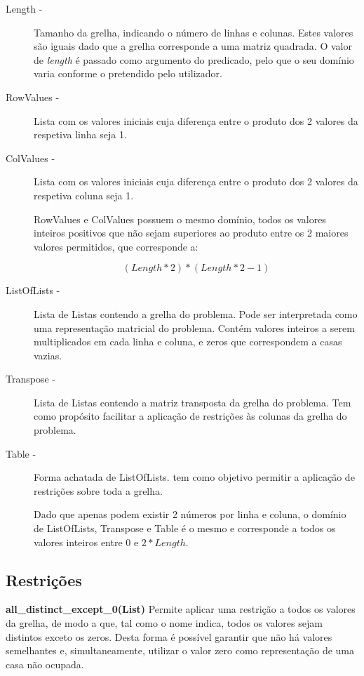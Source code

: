 \documentclass[11pt]{article}
\begin{document}
\begin{description}

\item[Length - ] Tamanho da grelha, indicando o número de linhas e colunas. Estes valores são 
iguais dado que a grelha corresponde a uma matriz quadrada. O valor de \emph{length} é passado 
como argumento do predicado, pelo que o seu domínio varia conforme o pretendido pelo utilizador.

\item[RowValues - ] Lista com os valores iniciais cuja diferença entre o produto dos 2 valores 
da respetiva linha seja 1.

\item[ColValues - ] Lista com os valores iniciais cuja diferença entre o produto dos 2 valores 
da respetiva coluna seja 1.

RowValues e ColValues possuem o mesmo domínio, todos os valores inteiros positivos que não 
sejam superiores ao produto entre os 2 maiores valores permitidos, que corresponde a:

\[(Length *2)*(Length * 2 - 1)\]

\item[ListOfLists - ] Lista de Listas contendo a grelha do problema. Pode ser interpretada 
como uma representação matricial do problema. Contém valores inteiros a serem multiplicados 
em cada linha e coluna, e zeros que correspondem a casas vazias.

\item[Transpose - ] Lista de Listas contendo a matriz transposta da grelha do problema. Tem 
como propósito facilitar a aplicação de restrições às colunas da grelha do problema.

\item[Table - ] Forma achatada de ListOfLists. tem como objetivo permitir a aplicação de 
restrições sobre toda a grelha. 

Dado que apenas podem existir 2 números por linha e coluna, o domínio de ListOfLists, 
Transpose e Table é o mesmo e corresponde a todos os valores inteiros entre 0 e \(2*Length\).



\end{description}

\subsection{Restrições}

\textbf{ all\_distinct\_except\_0(List)} Permite aplicar uma restrição a todos os valores da 
grelha, de modo a que, tal como o nome indica, todos os valores sejam distintos exceto os zeros. 
Desta forma é possível garantir que não há valores semelhantes e, simultaneamente, utilizar o 
valor zero como representação de uma casa não ocupada.
\end{document}
